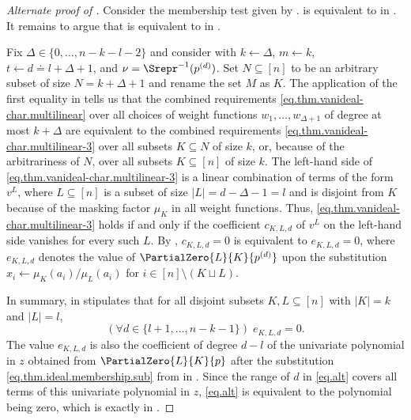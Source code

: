 \begin{proof}[Alternate proof of ]
Consider the membership test given by .  is equivalent to 
 in . It remains to argue that  is equivalent to  in . 

Fix $\Delta \in \{0,\dots,n-k-l-2\}$ and consider   with $k \gets \Delta$, $m \gets k$, $t \gets d \doteq l+\Delta+1$, and $\nu = \Srepr^{-1}(p^{(d)})$. Set $N \subseteq [n]$ to be an arbitrary subset of size $N=k+\Delta+1$ and rename the set $M$ as $K$. The application of the first equality in  tells us that the combined requirements \eqref{eq.thm.vanideal-char.multilinear} over all choices of weight functions \(w_1,\ldots,w_{\Delta+1}\) of degree at most \(k+\Delta\) are equivalent to the combined requirements
\eqref{eq.thm.vanideal-char.multilinear-3} over all subsets $K \subseteq N$ of size $k$, or, because of the arbitrariness of $N$, over all subsets $K \subseteq [n]$ of size $k$. The left-hand side of \eqref{eq.thm.vanideal-char.multilinear-3} is a linear combination of terms of the form $v^L$, where $L \subseteq [n]$ is a subset of size $|L|=d-\Delta-1=l$ and is disjoint from $K$ because of the masking factor $\mu_K$ in all weight functions. Thus, \eqref{eq.thm.vanideal-char.multilinear-3} holds if and only if the coefficient $c_{K,L,d}$ of $v^L$ on the left-hand side vanishes for every such $L$. By , $c_{K,L,d}=0$ is equivalent to $e_{K,L,d}=0$, where $e_{K,L,d}$ denotes the value of $\PartialZero{L}{K}{p^{(d)}}$ upon the substitution $x_i\gets \mu_K(a_i)/\mu_L(a_i)$ for $i \in [n]\setminus (K \sqcup L)$.

In summary,  in
 stipulates that for all disjoint subsets $K,L \subseteq [n]$ with $|K|=k$ and $|L|=l$,
\begin{equation}\label{eq.alt}
(\forall d \in \{l+1,\dots,n-k-1\}) \; e_{K,L,d} = 0.
\end{equation}
The value $e_{K,L,d}$ is also the coefficient of degree $d-l$ of the univariate polynomial in $z$ obtained from $\PartialZero{L}{K}{p}$ after the substitution  \eqref{eq.thm.ideal.membership.sub} from  in . Since the range of $d$ in \eqref{eq.alt} covers all terms of this univariate polynomial in $z$, \eqref{eq.alt} is equivalent to the polynomial being zero, which is exactly  in .
\end{proof}



